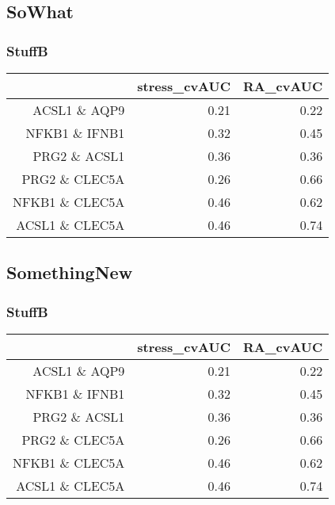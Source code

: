 \documentclass{beamer}
\begin{document}
\subsection{SoWhat}

\begin{frame}[fragile]
  	\frametitle{StuffB}
 		\begin{table}[ht]
  		\centering
  		\begin{tabular}{rrr}
   			\hline
   			& stress\_cvAUC & RA\_cvAUC \\ 
   			\hline
  			ACSL1 \& AQP9 & 0.21 & 0.22 \\ 
  			NFKB1 \& IFNB1 & 0.32 & 0.45 \\ 
  			PRG2 \& ACSL1 & 0.36 & 0.36 \\ 
  			PRG2 \& CLEC5A & 0.26 & 0.66 \\ 
  			NFKB1 \& CLEC5A & 0.46 & 0.62 \\ 
  			ACSL1 \& CLEC5A & 0.46 & 0.74 \\ 
   			\hline
		\end{tabular}
		\end{table}
\end{frame}

\subsection{SomethingNew}

\begin{frame}[fragile]
  	\frametitle{StuffB}
 		\begin{table}[ht]
  		\centering
  		\begin{tabular}{rrr}
   			\hline
   			& stress\_cvAUC & RA\_cvAUC \\ 
   			\hline
  			ACSL1 \& AQP9 & 0.21 & 0.22 \\ 
  			NFKB1 \& IFNB1 & 0.32 & 0.45 \\ 
  			PRG2 \& ACSL1 & 0.36 & 0.36 \\ 
  			PRG2 \& CLEC5A & 0.26 & 0.66 \\ 
  			NFKB1 \& CLEC5A & 0.46 & 0.62 \\ 
  			ACSL1 \& CLEC5A & 0.46 & 0.74 \\ 
   			\hline
		\end{tabular}
		\end{table}
\end{frame}
\end{document}

